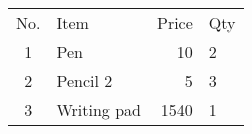 \documentclass{article}
\begin{document}
    \begin{tabular}{cp{4cm}rl}
        No. & Item & Price & Qty\\
        1 & Pen & 10 & 2\\
        2 & Pencil 2 & 5 & 3\\
        3 & Writing pad & 1540 & 1\\
    \end{tabular}
\end{document}

